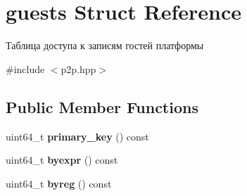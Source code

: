 \hypertarget{structguests}{}\section{guests Struct Reference}
\label{structguests}


Таблица доступа к записям гостей платформы  




{\ttfamily \#include $<$p2p.\+hpp$>$}

\subsection*{Public Member Functions}
\begin{DoxyCompactItemize}
\item 
\mbox{\label{structguests_aa44a7691d4254e2f580a64791b061d70}} 
uint64\+\_\+t {\bfseries primary\+\_\+key} () const
\item 
\mbox{\label{structguests_a1f409e9372ba160ae769a2057decf311}} 
uint64\+\_\+t {\bfseries byexpr} () const
\item 
\mbox{\label{structguests_a56bc73e33f8f164d28f05e009d19eeaa}} 
uint64\+\_\+t {\bfseries byreg} () const
\end{DoxyCompactItemize}
